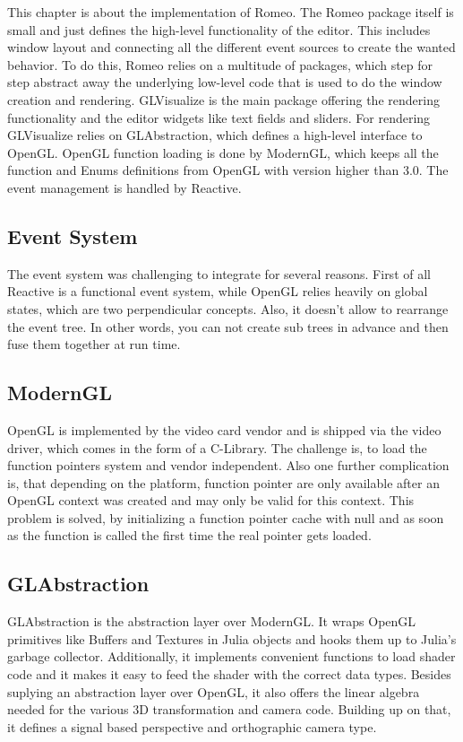 This chapter is about the implementation of Romeo.
The Romeo package itself is small and just defines the high-level functionality of the editor.
This includes window layout and connecting all the different event sources to create the wanted behavior.
To do this, Romeo relies on a multitude of packages, which step for step abstract away the underlying low-level code that is used to do the window creation and rendering.
GLVisualize is the main package offering the rendering functionality and the editor widgets like text fields and sliders.
For rendering GLVisualize relies on GLAbstraction, which defines a high-level interface to \ac{OpenGL}.
\ac{OpenGL} function loading is done by ModernGL, which keeps all the function and Enums definitions from \ac{OpenGL} with version higher than 3.0.
The event management is handled by Reactive.

\subsection{Event System}

The event system was challenging to integrate for several reasons.
First of all Reactive is a functional event system, while \ac{OpenGL} relies heavily on global states, which are two perpendicular concepts.
Also, it doesn't allow to rearrange the event tree. 
In other words, you can not create sub trees in advance and then fuse them together at run time.

\subsection{ModernGL}
\ac{OpenGL} is implemented by the video card vendor and is shipped via the video driver, which comes in the form of a C-Library.
The challenge is, to load the function pointers system and vendor independent. 
Also one further complication is, that depending on the platform, function pointer are only available after an \ac{OpenGL} context was created and may only be valid for this context. \cite{wgl}
This problem is solved, by initializing a function pointer cache with null and as soon as the function is called the first time the real pointer gets loaded.



\subsection{GLAbstraction}
GLAbstraction is the abstraction layer over ModernGL.
It wraps \ac{OpenGL} primitives like Buffers and Textures in Julia objects and hooks them up to Julia's garbage collector.
Additionally, it implements convenient functions to load shader code and it makes it easy to feed the shader with the correct data types.
Besides suplying an abstraction layer over \ac{OpenGL}, it also offers the linear algebra needed for the various 3D transformation and camera code.
Building up on that, it defines a signal based perspective and orthographic camera type.

